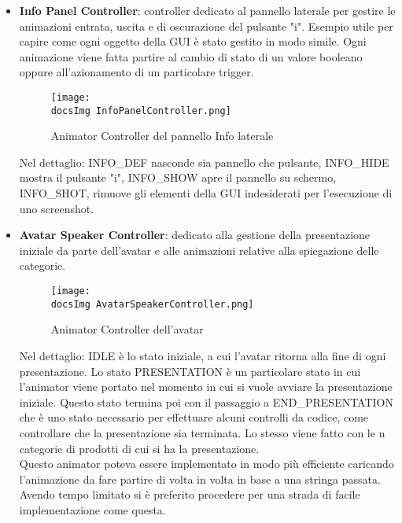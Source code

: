 \begin{itemize}
	\item \textbf{Info Panel Controller}: controller dedicato al pannello laterale per gestire le animazioni entrata, uscita e di oscurazione del pulsante "i". Esempio utile per capire come ogni oggetto della GUI \`e stato gestito in modo simile. Ogni animazione viene fatta partire al cambio di stato di un valore booleano oppure all'azionamento di un particolare trigger.
	
	\begin{figure}[H]
		\centering
		\texttt{[image: \\docsImg InfoPanelController.png]}
		\caption{Animator Controller del pannello Info laterale}
		\label{fig:Animator Controller del pannello Info laterale}
	\end{figure}
	
	Nel dettaglio: INFO\_DEF nasconde sia pannello che pulsante, INFO\_HIDE mostra il pulsante "i", INFO\_SHOW apre il pannello su schermo, INFO\_SHOT, rimuove gli elementi della GUI indesiderati per l'esecuzione di uno screenshot.
	
	\item \textbf{Avatar Speaker Controller}: dedicato alla gestione della presentazione iniziale da parte dell'avatar e alle animazioni relative alla spiegazione delle categorie.
	
	\begin{figure}[H]
		\centering
		\texttt{[image: \\docsImg AvatarSpeakerController.png]}
		\caption{Animator Controller dell'avatar}
		\label{fig:Animator Controller dell'avatar}
	\end{figure}
	
	Nel dettaglio: IDLE \`e lo stato iniziale, a cui l'avatar ritorna alla fine di ogni presentazione. Lo stato PRESENTATION \`e un particolare stato in cui l'animator viene portato nel momento in cui si vuole avviare la presentazione iniziale. Questo stato termina poi con il passaggio a END\_PRESENTATION che \`e uno stato necessario per effettuare alcuni controlli da codice, come controllare che la presentazione sia terminata. Lo stesso viene fatto con le n categorie di prodotti di cui si ha la presentazione.\\ Questo animator poteva essere implementato in modo pi\`u efficiente caricando l'animazione da fare partire di volta in volta in base a una stringa passata. Avendo tempo limitato si \`e preferito procedere per una strada di facile implementazione come questa.
\end{itemize}






